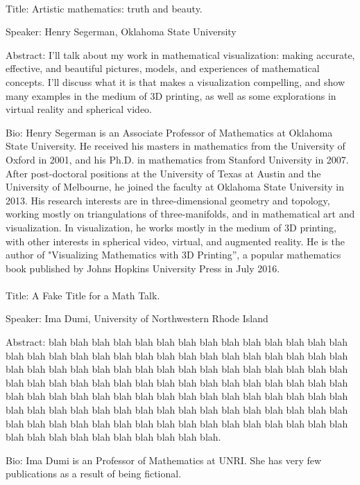 \documentclass[10pt,]{article}
\theoremstyle{plain}
\begin{document}
\paragraph[{}]{}\hypertarget{paragraphs-1}{}
\hypertarget{p-2}{}%
Title: Artistic mathematics: truth and beauty.%
\par
\hypertarget{p-3}{}%
Speaker: Henry Segerman, Oklahoma State University%
\par
\hypertarget{p-4}{}%
Abstract: I'll talk about my work in mathematical visualization: making accurate, effective, and beautiful pictures, models, and experiences of mathematical concepts. I'll discuss what it is that makes a visualization compelling, and show many examples in the medium of 3D printing, as well as some explorations in virtual reality and spherical video.%
\par
\hypertarget{p-5}{}%
Bio: Henry Segerman is an Associate Professor of Mathematics at Oklahoma State University.  He received his masters in mathematics from the University of Oxford in 2001, and his Ph.D. in mathematics from Stanford University in 2007. After post-doctoral positions at the University of Texas at Austin and the University of Melbourne, he joined the faculty at Oklahoma State University in 2013. His research interests are in three-dimensional geometry and topology, working mostly on triangulations of three-manifolds, and in mathematical art and visualization. In visualization, he works mostly in the medium of 3D printing, with other interests in spherical video, virtual, and augmented reality. He is the author of "Visualizing Mathematics with 3D Printing”, a popular mathematics book published by Johns Hopkins University Press in July 2016.%
\typeout{************************************************}
\typeout{************************************************}
\paragraph[{}]{}\hypertarget{paragraphs-2}{}
\hypertarget{p-6}{}%
Title: A Fake Title for a Math Talk.%
\par
\hypertarget{p-7}{}%
Speaker: Ima Dumi, University of Northwestern Rhode Island%
\par
\hypertarget{p-8}{}%
Abstract: blah blah blah blah blah blah blah blah blah blah blah blah blah blah blah blah blah blah blah blah blah blah blah blah blah blah blah blah blah blah blah blah blah blah blah blah blah blah blah blah blah blah blah blah blah blah blah blah blah blah blah blah blah blah blah blah blah blah blah blah blah blah blah blah blah blah blah blah blah blah blah blah blah blah blah blah blah blah blah blah blah blah blah blah blah blah blah blah blah blah blah blah blah blah blah blah blah blah blah blah blah blah blah blah blah blah blah blah blah blah blah blah blah blah blah blah blah blah blah blah.%
\par
\hypertarget{p-9}{}%
Bio: Ima Dumi is an Professor of Mathematics at UNRI.  She has very few publications as a result of being fictional.%
\typeout{************************************************}
\typeout{************************************************}
\end{document}
